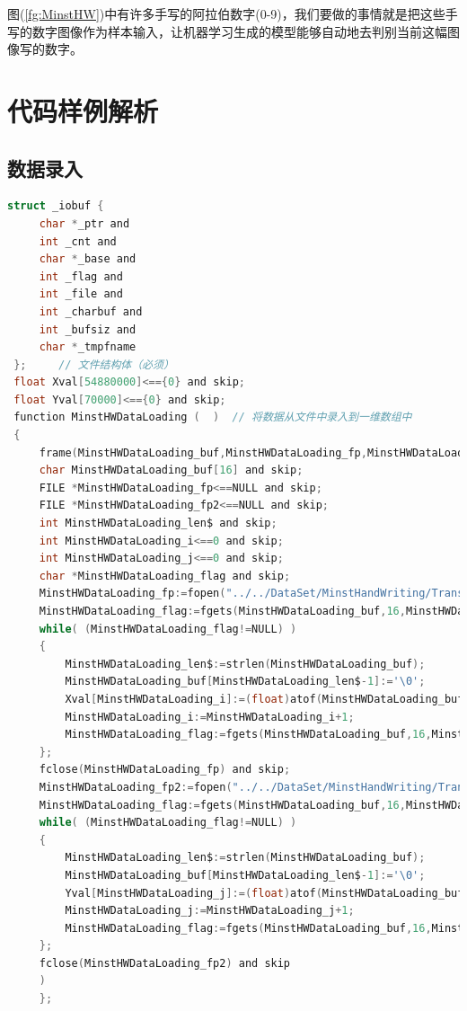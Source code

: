 \documentclass[UTF-8]{progbookcn}
\begin{document}
图(\ref{fg:MinstHW})中有许多手写的阿拉伯数字(0-9)，我们要做的事情就是把这些手写的数字图像作为样本输入，让机器学习生成的模型能够自动地去判别当前这幅图像写的数字。
\section{代码样例解析}
\subsection{数据录入}
\begin{lstlisting}[language=C,caption={数据录入函数代码}]
struct _iobuf {
     char *_ptr and
     int _cnt and
     char *_base and
     int _flag and
     int _file and
     int _charbuf and
     int _bufsiz and
     char *_tmpfname
 };     // 文件结构体（必须）
 float Xval[54880000]<=={0} and skip;
 float Yval[70000]<=={0} and skip;
 function MinstHWDataLoading (  )  // 将数据从文件中录入到一维数组中
 {
     frame(MinstHWDataLoading_buf,MinstHWDataLoading_fp,MinstHWDataLoading_fp2,MinstHWDataLoading_len$,MinstHWDataLoading_i,MinstHWDataLoading_j,MinstHWDataLoading_flag) and (
     char MinstHWDataLoading_buf[16] and skip;
     FILE *MinstHWDataLoading_fp<==NULL and skip;
     FILE *MinstHWDataLoading_fp2<==NULL and skip;
     int MinstHWDataLoading_len$ and skip;
     int MinstHWDataLoading_i<==0 and skip;
     int MinstHWDataLoading_j<==0 and skip;
     char *MinstHWDataLoading_flag and skip;
     MinstHWDataLoading_fp:=fopen("../../DataSet/MinstHandWriting/Transformation/MinstHW-70000/DataFeatrue.msd","r");
     MinstHWDataLoading_flag:=fgets(MinstHWDataLoading_buf,16,MinstHWDataLoading_fp);
     while( (MinstHWDataLoading_flag!=NULL) )
     {
         MinstHWDataLoading_len$:=strlen(MinstHWDataLoading_buf);
         MinstHWDataLoading_buf[MinstHWDataLoading_len$-1]:='\0';
         Xval[MinstHWDataLoading_i]:=(float)atof(MinstHWDataLoading_buf);
         MinstHWDataLoading_i:=MinstHWDataLoading_i+1;
         MinstHWDataLoading_flag:=fgets(MinstHWDataLoading_buf,16,MinstHWDataLoading_fp)
     };
     fclose(MinstHWDataLoading_fp) and skip;
     MinstHWDataLoading_fp2:=fopen("../../DataSet/MinstHandWriting/Transformation/MinstHW-70000/DataLabel.msd","r");
     MinstHWDataLoading_flag:=fgets(MinstHWDataLoading_buf,16,MinstHWDataLoading_fp2);
     while( (MinstHWDataLoading_flag!=NULL) )
     {
         MinstHWDataLoading_len$:=strlen(MinstHWDataLoading_buf);
         MinstHWDataLoading_buf[MinstHWDataLoading_len$-1]:='\0';
         Yval[MinstHWDataLoading_j]:=(float)atof(MinstHWDataLoading_buf);
         MinstHWDataLoading_j:=MinstHWDataLoading_j+1;
         MinstHWDataLoading_flag:=fgets(MinstHWDataLoading_buf,16,MinstHWDataLoading_fp2)
     };
     fclose(MinstHWDataLoading_fp2) and skip
     )
     };
\end{lstlisting}
\end{document}
